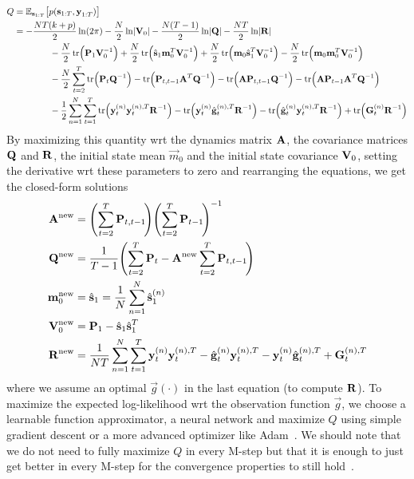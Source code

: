 	\begin{align*}
		Q
			&= \E_{\vec{s}_{1:T}}\big[ p(\vec{s}_{1:T}, \vec{y}_{1:T}) \big] \\
			&= -\frac{NT(k + p)}{2} \ln(2\pi) - \frac{N}{2} \ln \lvert \mat{V}_0 \rvert - \frac{N(T - 1)}{2} \ln \lvert \mat{Q} \rvert - \frac{NT}{2} \ln \lvert \mat{R} \rvert \\
			&\qquad\qquad -\frac{N}{2} \tr\!\Big( \mat{P}_1 \mat{V}_0^{-1} \Big) + \frac{N}{2} \tr\!\Big( \hat{\vec{s}}_1 \vec{m}_0^T \mat{V}_0^{-1} \Big) + \frac{N}{2} \tr\!\Big( \vec{m}_0 \hat{\vec{s}}_1^T \mat{V}_0^{-1} \Big) - \frac{N}{2} \tr\!\Big(\vec{m}_0 \vec{m}_0^T \mat{V}_0^{-1} \Big) \\
			&\qquad\qquad -\frac{N}{2} \sum_{t = 2}^{T} \tr\!\Big( \mat{P}_t \mat{Q}^{-1} \Big) - \tr\!\Big( \mat{P}_{t, t - 1} \mat{A}^T \mat{Q}^{-1} \Big) - \tr\!\Big( \mat{A} \mat{P}_{t, t - 1} \mat{Q}^{-1} \Big) - \tr\!\Big( \mat{A} \mat{P}_{t - 1} \mat{A}^T \mat{Q}^{-1} \Big) \\
			&\qquad\qquad -\frac{1}{2} \sum_{n = 1}^{N} \sum_{t = 1}^{T} \tr\!\Big( \vec{y}_t^{(n)} \vec{y}_t^{(n), T} \mat{R}^{-1} \Big) - \tr\!\Big( \vec{y}_t^{(n)} \hat{\vec{g}}_t^{(n), T} \mat{R}^{-1} \Big) - \tr\!\Big( \hat{\vec{g}}_t^{(n)} \vec{y}_t^{(n), T} \mat{R}^{-1} \Big) + \tr\!\Big( \mat{G}_t^{(n)} \mat{R}^{-1} \Big)
	\end{align*}
	By maximizing this quantity \ac{wrt} the dynamics matrix \(\boldsymbol{\mathrm{A}}\), the covariance matrices \(\boldsymbol{\mathrm{Q}}\) and \(\boldsymbol{\mathrm{R}}\), the initial state mean \(\vec{m}_0\) and the initial state covariance \(\boldsymbol{\mathrm{V}}_0\), \ie setting the derivative \ac{wrt} these parameters to zero and rearranging the equations, we get the closed-form solutions
	\begin{align*}
		\boldsymbol{\mathrm{A}}^{\mathrm{new}}   &= \Bigg(\! \sum_{t = 2}^{T} \boldsymbol{\mathrm{P}}_{t, t - 1} \!\Bigg) \Bigg(\! \sum_{t = 2}^{T} \boldsymbol{\mathrm{P}}_{t - 1} \!\Bigg)^{-1} \\
		\boldsymbol{\mathrm{Q}}^{\mathrm{new}}   &= \frac{1}{T - 1} \Bigg(\! \sum_{t = 2}^{T} \boldsymbol{\mathrm{P}}_t - \boldsymbol{\mathrm{A}}^{\mathrm{new}} \sum_{t = 2}^{T} \boldsymbol{\mathrm{P}}_{t, t - 1} \!\Bigg) \\
		\boldsymbol{\mathrm{m}}_0^{\mathrm{new}} &= \hat{\boldsymbol{\mathrm{s}}}_1 = \frac{1}{N} \sum_{n = 1}^{N} \hat{\boldsymbol{\mathrm{s}}}_1^{(n)} \\
		\boldsymbol{\mathrm{V}}_0^{\mathrm{new}} &= \boldsymbol{\mathrm{P}}_1 - \hat{\boldsymbol{\mathrm{s}}}_1 \hat{\boldsymbol{\mathrm{s}}}_1^T \\
		\boldsymbol{\mathrm{R}}^{\mathrm{new}}   &= \frac{1}{NT} \sum_{n = 1}^{N} \sum_{t = 1}^{T} \boldsymbol{\mathrm{y}}_t^{(n)} \boldsymbol{\mathrm{y}}_t^{(n), T} - \hat{\boldsymbol{\mathrm{g}}}_t^{(n)} \boldsymbol{\mathrm{y}}_t^{(n), T} - \boldsymbol{\mathrm{y}}_t^{(n)} \hat{\boldsymbol{\mathrm{g}}}_t^{(n), T} + \boldsymbol{\mathrm{G}}_t^{(n), T}
	\end{align*}
	where we assume an optimal \( \vec{g}(\cdot) \) in the last equation (to compute \(\boldsymbol{\mathrm{R}}\)). To maximize the expected log-likelihood \ac{wrt} the observation function \( \vec{g} \), we choose a learnable function approximator, \eg a neural network and maximize \(Q\) using simple gradient descent or a more advanced optimizer like Adam~\cite{kingmaAdamMethodStochastic2017}. We should note that we do not need to fully maximize \(Q\) in every M-step but that it is enough to just get better in every M-step for the convergence properties to still hold~\cite{dempsterMaximumLikelihoodIncomplete1977a}.

